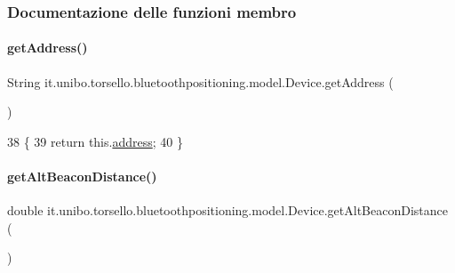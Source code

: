 \subsubsection{Documentazione delle funzioni membro}
\hypertarget{classit_1_1unibo_1_1torsello_1_1bluetoothpositioning_1_1model_1_1Device_ae4cd3fdda7414388cbda796f62543d5b_ae4cd3fdda7414388cbda796f62543d5b}{}\label{classit_1_1unibo_1_1torsello_1_1bluetoothpositioning_1_1model_1_1Device_ae4cd3fdda7414388cbda796f62543d5b_ae4cd3fdda7414388cbda796f62543d5b} 
\paragraph{\texorpdfstring{get\+Address()}{getAddress()}}
{\footnotesize\ttfamily String it.\+unibo.\+torsello.\+bluetoothpositioning.\+model.\+Device.\+get\+Address (\begin{DoxyParamCaption}{ }\end{DoxyParamCaption})}


\begin{DoxyCode}
38                                \{
39         \textcolor{keywordflow}{return} this.\hyperlink{classit_1_1unibo_1_1torsello_1_1bluetoothpositioning_1_1model_1_1Device_a0abcf7e0df4ccc96e487c6f9b90b4e13_a0abcf7e0df4ccc96e487c6f9b90b4e13}{address};
40     \}
\end{DoxyCode}
\hypertarget{classit_1_1unibo_1_1torsello_1_1bluetoothpositioning_1_1model_1_1Device_aa178afb829c0b5cae49af25e0e9b2117_aa178afb829c0b5cae49af25e0e9b2117}{}\label{classit_1_1unibo_1_1torsello_1_1bluetoothpositioning_1_1model_1_1Device_aa178afb829c0b5cae49af25e0e9b2117_aa178afb829c0b5cae49af25e0e9b2117} 
\paragraph{\texorpdfstring{get\+Alt\+Beacon\+Distance()}{getAltBeaconDistance()}}
{\footnotesize\ttfamily double it.\+unibo.\+torsello.\+bluetoothpositioning.\+model.\+Device.\+get\+Alt\+Beacon\+Distance (\begin{DoxyParamCaption}{ }\end{DoxyParamCaption})}


